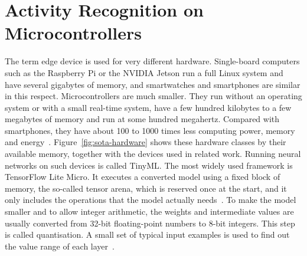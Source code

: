 \section{Activity Recognition on Microcontrollers}
\label{sec:sota-edge}

The term edge device is used for very different hardware. Single-board
computers such as the Raspberry Pi or the NVIDIA Jetson run a full Linux
system and have several gigabytes of memory, and smartwatches and smartphones
are similar in this respect. Microcontrollers are much smaller. They run
without an operating system or with a small real-time system, have a few
hundred kilobytes to a few megabytes of memory and run at some hundred
megahertz. Compared with smartphones, they have about 100 to 1000 times less
computing power, memory and energy~\cite{david2021tflm}.
Figure~\ref{fig:sota-hardware} shows these hardware classes by their available
memory, together with the devices used in related work. Running neural
networks on such devices is called TinyML. The most widely used framework is
TensorFlow Lite Micro. It executes a converted model using a fixed block of
memory, the so-called tensor arena, which is reserved once at the start, and it
only includes the operations that the model actually
needs~\cite{david2021tflm}. To make the model smaller and to allow integer
arithmetic, the weights and intermediate values are usually converted from
32-bit floating-point numbers to 8-bit integers. This step is called
quantisation. A small set of typical input examples is used to find out the
value range of each layer~\cite{zhou2025efficient}.

